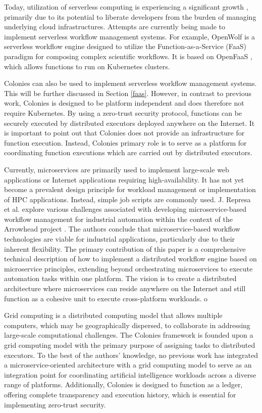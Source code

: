 \documentclass{article}
\begin{document}
Today, utilization of serverless computing is experiencing a significant growth \cite{cognit}, primarily due to its potential to liberate developers from the burden of managing underlying cloud infrastructures. Attempts are currently being made to implement serverless workflow management systems. For example, OpenWolf \cite{openwolf} is a serverless workflow engine designed to utilize the Function-as-a-Service (FaaS) paradigm for composing complex scientific workflows. It is based on OpenFaaS \cite{openfaas}, which allows functions to run on Kubernetes clusters. 

Colonies can also be used to implement serverless workflow management systems. This will be further discussed in Section \ref{faas}. However, in contrast to previous work, Colonies is designed to be platform independent and does therefore not require Kubernetes. By using a zero-trust security protocol, functions can be securely executed by distributed executors deployed anywhere on the Internet. It is important to point out that Colonies does not provide an infrastructure for function execution. Instead, Colonies primary role is to serve as a platform for coordinating function executions which are carried out by distributed executors.

Currently, microservices are primarily used to implement large-scale web applications or Internet applications requiring high-availability. It has not yet become a prevalent design principle for workload management or implementation of HPC applications. Instead, simple job scripts are commonly used. J. Represa et al. \cite{GarciaRepresa1740746, GarciaRepresa1640771} explore various challenges associated with developing microservice-based workflow management for industrial automation within the context of the Arrowhead project \cite{delsing2017iot}. The authors conclude that microservice-based workflow technologies are viable for industrial applications, particularly due to their inherent flexibility. The primary contribution of this paper is a comprehensive technical description of how to implement a distributed workflow engine based on microservice principles, extending beyond orchestrating microservices to execute automation tasks within one platform. The vision is to create a distributed architecture where microservices can reside anywhere on the Internet and still function as a cohesive unit to execute cross-platform workloads.  
o

Grid computing \cite{grid_computing} is a distributed computing model that allows multiple computers, which may be geographically dispersed, to collaborate in addressing large-scale computational challenges. The Colonies framework is founded upon a grid computing model with the primary purpose of assigning tasks to distributed executors. To the best of the authors' knowledge, no previous work has integrated a microservice-oriented architecture with a grid computing model to serve as an integration point for coordinating artificial intelligence workloads across a diverse range of platforms. Additionally, Colonies is designed to function as a ledger, offering complete transparency and execution history, which is essential for implementing zero-trust security.
\end{document}
